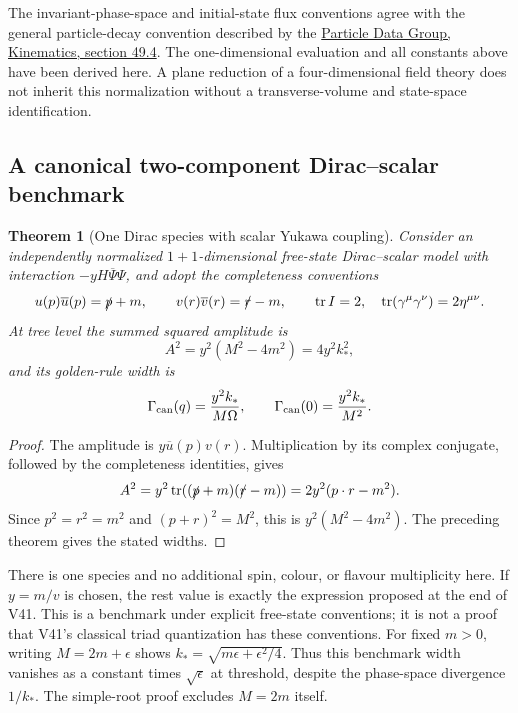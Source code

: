 \documentclass[11pt]{article}
\newtheorem{theorem}{Theorem}[section]
\theoremstyle{remark}
\begin{document}
The invariant-phase-space and initial-state flux conventions agree
with the general particle-decay convention described by the
\href{https://pdg.lbl.gov/2025/reviews/rpp2025-rev-kinematics.pdf}
{Particle Data Group, Kinematics, section 49.4}.
The one-dimensional evaluation and all constants above have been
derived here.  A plane reduction of a four-dimensional field theory
does not inherit this normalization without a transverse-volume and
state-space identification.

\subsection{A canonical two-component Dirac--scalar benchmark}

\begin{theorem}[One Dirac species with scalar Yukawa coupling]
\label{thm:v20v42-yukawa}
Consider an independently normalized \(1+1\)-dimensional free-state
Dirac--scalar model with interaction
\(-yH\overline\Psi\Psi\), and adopt the completeness conventions
\[
 u(p)\overline u(p)=\slashed p+m,\qquad
 v(r)\overline v(r)=\slashed r-m,\qquad
 \operatorname{tr}I=2,\quad
 \operatorname{tr}(\gamma^\mu\gamma^\nu)=2\eta^{\mu\nu}.
\]
At tree level the summed squared amplitude is
\[
 A^2=y^2(M^2-4m^2)=4y^2k_*^2,
\]
and its golden-rule width is
\[
 \Gamma_{\rm can}(q)=\frac{y^2 k_*}{M\Omega},
 \qquad \Gamma_{\rm can}(0)=\frac{y^2 k_*}{M^2}.
\]
\end{theorem}
\begin{proof}
The amplitude is \(y\overline u(p)v(r)\).  Multiplication by its
complex conjugate, followed by the completeness identities, gives
\[
 A^2=y^2\operatorname{tr}
 ((\slashed p+m)(\slashed r-m))
 =2y^2(p\cdot r-m^2).
\]
Since \(p^2=r^2=m^2\) and \((p+r)^2=M^2\), this is
\(y^2(M^2-4m^2)\).  The preceding theorem gives the stated widths.
\end{proof}

There is one species and no additional spin, colour, or flavour
multiplicity here.  If \(y=m/v\) is chosen, the rest value is exactly
the expression proposed at the end of V41.  This is a benchmark
under explicit free-state conventions; it is not a proof that
V41's classical triad quantization has these conventions.
For fixed \(m>0\), writing \(M=2m+\epsilon\) shows
\(k_*=\sqrt{m\epsilon+\epsilon^2/4}\).  Thus this benchmark width
vanishes as a constant times \(\sqrt{\epsilon}\) at threshold,
despite the phase-space divergence \(1/k_*\).
The simple-root proof excludes \(M=2m\) itself.
\end{document}
